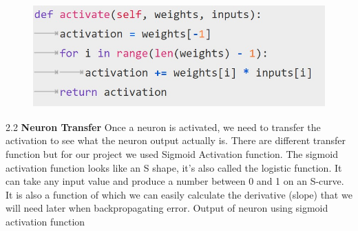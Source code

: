 \begin{figure}[H]
\begin{center}
\includegraphics[width=120mm,height=40mm]{backexplain/activate.jpg}
\end{center}
     
\end{figure}            
            


2.2 \textbf{Neuron Transfer}
Once a neuron is activated, we need to transfer the activation to see what the neuron output actually is.
There are different transfer function but for our project we used Sigmoid Activation function.\newline
The sigmoid activation function looks like an S shape, it’s also called the logistic function. It can take any input value and produce a number between 0 and 1 on an S-curve. It is also a function of which we can easily calculate the derivative (slope) that we will need later when backpropagating error.
\newline
Output of neuron using sigmoid activation function \newline
